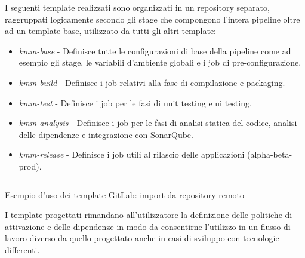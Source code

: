 I seguenti template realizzati sono organizzati in un repository separato, raggruppati logicamente secondo gli stage che compongono l'intera pipeline oltre ad un template base, utilizzato da tutti gli altri template:
\begin{itemize}
    \item \textit{kmm-base} - Definisce tutte le configurazioni di base della pipeline come ad esempio gli stage, le variabili d'ambiente globali e i job di pre-configurazione.
    \item \textit{kmm-build} - Definisce i job relativi alla fase di compilazione e packaging.
    \item \textit{kmm-test} - Definisce i job per le fasi di unit testing e ui testing.
    \item \textit{kmm-analysis} - Definisce i job per le fasi di analisi statica del codice, analisi delle dipendenze e integrazione con SonarQube.
    \item \textit{kmm-release} - Definisce i job utili al rilascio delle applicazioni (alpha-beta-prod).
\end{itemize}

\begin{listing}[H]
\inputminted{yaml}{code/4-templating}
\caption{Esempio d'uso dei template GitLab: import da repository remoto}
\end{listing}

I template progettati rimandano all'utilizzatore la definizione delle politiche di attivazione e delle dipendenze in modo da consentirne l'utilizzo in un flusso di lavoro diverso da quello progettato anche in casi di sviluppo con tecnologie differenti.


